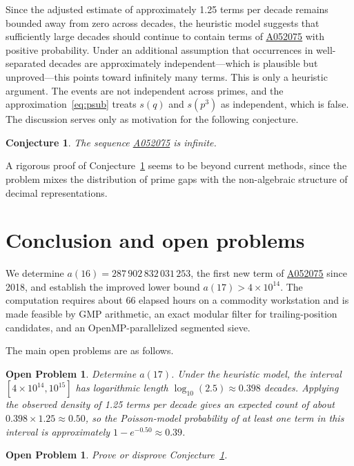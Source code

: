 \documentclass[12pt,reqno]{article}
\theoremstyle{plain}
\newtheorem{conjecture}[theorem]{Conjecture}
\newtheorem{openproblem}[theorem]{Open Problem}
\theoremstyle{definition}
\theoremstyle{remark}
\newcommand{\seqnum}[1]{\href{https://oeis.org/#1}{\rm \underline{#1}}}
\begin{document}
Since the adjusted estimate of approximately 1.25 terms per decade
remains bounded away from zero across decades, the heuristic model
suggests that sufficiently large decades should continue to contain
terms of \seqnum{A052075} with positive probability.
Under an additional assumption that occurrences in well-separated
decades are approximately independent---which is plausible but
unproved---this points toward infinitely many terms.
This is only a heuristic argument.
The events are not independent across primes, and the
approximation~\eqref{eq:psub} treats $s(q)$ and $s(p^3)$ as
independent, which is false.
The discussion serves only as motivation for the following conjecture.

\begin{conjecture}
\label{conj:infinite}
The sequence \seqnum{A052075} is infinite.
\end{conjecture}

A rigorous proof of Conjecture~\ref{conj:infinite} seems to be beyond
current methods, since the problem mixes the distribution of prime gaps
with the non-algebraic structure of decimal representations.

\section{Conclusion and open problems}
\label{sec:conclusion}

We determine $a(16) = 287\,902\,832\,031\,253$, the first new term of
\seqnum{A052075} since 2018, and establish the improved lower bound
$a(17) > 4 \times 10^{14}$.
The computation requires about 66 elapsed hours on a commodity
workstation and is made feasible by GMP arithmetic, an exact modular
filter for trailing-position candidates, and an OpenMP-parallelized
segmented sieve.

The main open problems are as follows.

\begin{openproblem}
\label{op:a17}
Determine $a(17)$.
Under the heuristic model, the interval $[4 \times 10^{14}, 10^{15}]$
has logarithmic length $\log_{10}(2.5) \approx 0.398$ decades.
Applying the observed density of 1.25 terms per decade gives an
expected count of about $0.398 \times 1.25 \approx 0.50$, so the
Poisson-model probability of at least one term in this interval
is approximately $1 - e^{-0.50} \approx 0.39$.
\end{openproblem}

\begin{openproblem}
\label{op:infinite}
Prove or disprove Conjecture~\ref{conj:infinite}.
\end{openproblem}
\end{document}
